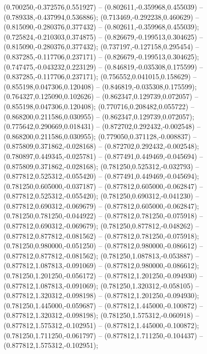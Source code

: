  (0.700250,-0.372576,0.551927) -- (0.802611,-0.359968,0.455039) -- (0.789338,-0.437994,0.536886);
 (0.713469,-0.292238,0.460629) -- (0.815090,-0.280376,0.377432) -- (0.802611,-0.359968,0.455039);
 (0.725824,-0.210303,0.374875) -- (0.826679,-0.199513,0.304625) -- (0.815090,-0.280376,0.377432);
 (0.737197,-0.127158,0.295454) -- (0.837285,-0.117706,0.237171) -- (0.826679,-0.199513,0.304625);
 (0.747475,-0.043232,0.223129) -- (0.846819,-0.035308,0.175599) -- (0.837285,-0.117706,0.237171);
 (0.756552,0.041015,0.158629) -- (0.855198,0.047306,0.120408) -- (0.846819,-0.035308,0.175599);
 (0.764327,0.125090,0.102626) -- (0.862347,0.129739,0.072057) -- (0.855198,0.047306,0.120408);
 (0.770716,0.208482,0.055722) -- (0.868200,0.211586,0.030955) -- (0.862347,0.129739,0.072057);
 (0.775642,0.290669,0.018431) -- (0.872702,0.292432,-0.002548) -- (0.868200,0.211586,0.030955);
 (0.779050,0.371128,-0.008837) -- (0.875809,0.371862,-0.028168) -- (0.872702,0.292432,-0.002548);
 (0.780897,0.449345,-0.025781) -- (0.877491,0.449469,-0.045694) -- (0.875809,0.371862,-0.028168);
 (0.781250,0.525312,-0.032793) -- (0.877812,0.525312,-0.055420) -- (0.877491,0.449469,-0.045694);
 (0.781250,0.605000,-0.037187) -- (0.877812,0.605000,-0.062847) -- (0.877812,0.525312,-0.055420);
 (0.781250,0.690312,-0.041230) -- (0.877812,0.690312,-0.069679) -- (0.877812,0.605000,-0.062847);
 (0.781250,0.781250,-0.044922) -- (0.877812,0.781250,-0.075918) -- (0.877812,0.690312,-0.069679);
 (0.781250,0.877812,-0.048262) -- (0.877812,0.877812,-0.081562) -- (0.877812,0.781250,-0.075918);
 (0.781250,0.980000,-0.051250) -- (0.877812,0.980000,-0.086612) -- (0.877812,0.877812,-0.081562);
 (0.781250,1.087813,-0.053887) -- (0.877812,1.087813,-0.091069) -- (0.877812,0.980000,-0.086612);
 (0.781250,1.201250,-0.056172) -- (0.877812,1.201250,-0.094930) -- (0.877812,1.087813,-0.091069);
 (0.781250,1.320312,-0.058105) -- (0.877812,1.320312,-0.098198) -- (0.877812,1.201250,-0.094930);
 (0.781250,1.445000,-0.059687) -- (0.877812,1.445000,-0.100872) -- (0.877812,1.320312,-0.098198);
 (0.781250,1.575312,-0.060918) -- (0.877812,1.575312,-0.102951) -- (0.877812,1.445000,-0.100872);
 (0.781250,1.711250,-0.061797) -- (0.877812,1.711250,-0.104437) -- (0.877812,1.575312,-0.102951);
